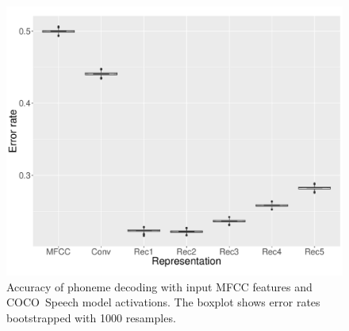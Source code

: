 \begin{figure}[t]
  \centering
  \includegraphics[scale=0.3]{figures/decode.pdf}
  \vspace{-1cm}
     \caption{Accuracy of phoneme decoding with input MFCC features
       and COCO~Speech model activations. The boxplot shows error rates
       bootstrapped with 1000 resamples.}
     \label{fig:decode}
\end{figure}

